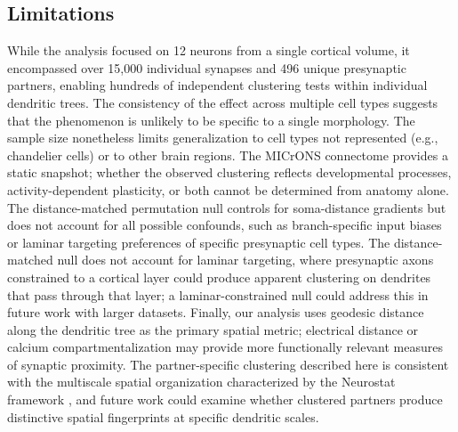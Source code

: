 \subsection{Limitations}

While the analysis focused on 12 neurons from a single cortical volume, it encompassed over 15,000 individual synapses and 496 unique presynaptic partners, enabling hundreds of independent clustering tests within individual dendritic trees. The consistency of the effect across multiple cell types suggests that the phenomenon is unlikely to be specific to a single morphology. The sample size nonetheless limits generalization to cell types not represented (e.g., chandelier cells) or to other brain regions. The MICrONS connectome provides a static snapshot; whether the observed clustering reflects developmental processes, activity-dependent plasticity, or both cannot be determined from anatomy alone. The distance-matched permutation null controls for soma-distance gradients but does not account for all possible confounds, such as branch-specific input biases or laminar targeting preferences of specific presynaptic cell types. The distance-matched null does not account for laminar targeting, where presynaptic axons constrained to a cortical layer could produce apparent clustering on dendrites that pass through that layer; a laminar-constrained null could address this in future work with larger datasets. Finally, our analysis uses geodesic distance along the dendritic tree as the primary spatial metric; electrical distance or calcium compartmentalization may provide more functionally relevant measures of synaptic proximity. The partner-specific clustering described here is consistent with the multiscale spatial organization characterized by the Neurostat framework \citep{neurostat}, and future work could examine whether clustered partners produce distinctive spatial fingerprints at specific dendritic scales.
